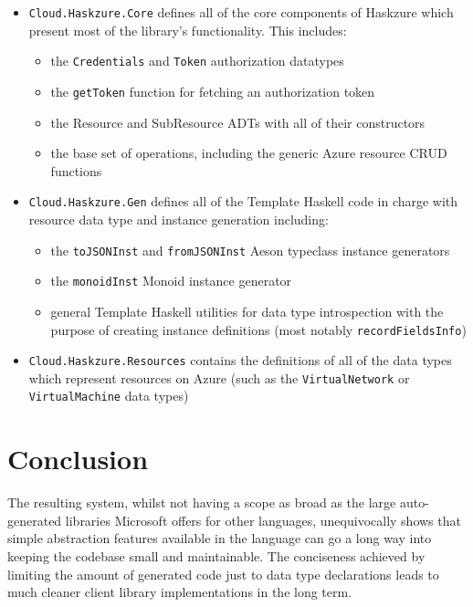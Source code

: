 \documentclass[11pt]{report}
\begin{document}
\begin{itemize}
    \item{} \texttt{Cloud.Haskzure.Core} defines all of the core components of
        Haskzure which present most of the library's functionality. This
        includes:
        \begin{itemize}
            \item{} the \texttt{Credentials} and \texttt{Token} authorization
                datatypes
            \item{} the \texttt{getToken} function for fetching an
                authorization token
            \item{} the Resource and SubResource ADTs with all of their
                constructors
            \item{} the base set of operations, including the generic Azure
                resource CRUD functions
        \end{itemize}
    \item{} \texttt{Cloud.Haskzure.Gen} defines all of the Template Haskell
        code in charge with resource data type and instance generation
        including:
        \begin{itemize}
            \item{} the \texttt{toJSONInst} and \texttt{fromJSONInst} Aeson
                typeclass instance generators
            \item{} the \texttt{monoidInst} Monoid instance generator
            \item{} general Template Haskell utilities for data type
                introspection with the purpose of creating instance definitions
                (most notably \texttt{recordFieldsInfo})
        \end{itemize}
    \item{} \texttt{Cloud.Haskzure.Resources} contains the definitions of all
        of the data types which represent resources on Azure (such as the
        \texttt{VirtualNetwork} or \texttt{VirtualMachine} data types)
\end{itemize}


\chapter{Conclusion}


The resulting system, whilst not having a scope as broad as the large
auto-generated libraries Microsoft offers for other languages, unequivocally
shows that simple abstraction features available in the language can go a long
way into keeping the codebase small and maintainable. The conciseness achieved
by limiting the amount of generated code just to data type declarations leads
to much cleaner client library implementations in the long term.


\nocite{*}


\end{document}
